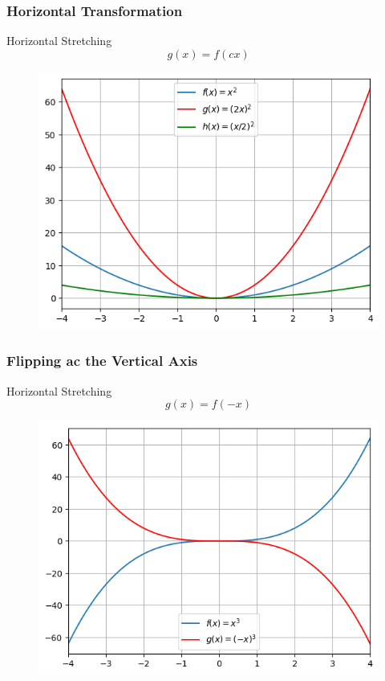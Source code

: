 \documentclass{beamer}
\begin{document}
\begin{frame}
    \frametitle{Horizontal Transformation}
    \begin{block}{Horizontal Stretching}
      \[g(x) = f(cx)\]
    \end{block}
    \begin{figure}[h]    
      \centering
      \includegraphics[scale=0.55]{horizontal-stretch.png}
      \end{figure}
\end{frame}

\begin{frame}
  \frametitle{Flipping ac the Vertical Axis}
  \begin{block}{Horizontal Stretching}
    \[g(x) = f(-x)\]
  \end{block}
  \begin{figure}[h]    
    \centering
    \includegraphics[scale=0.55]{vertical-axis-flip.png}
    \end{figure}
\end{frame}
\end{document}
